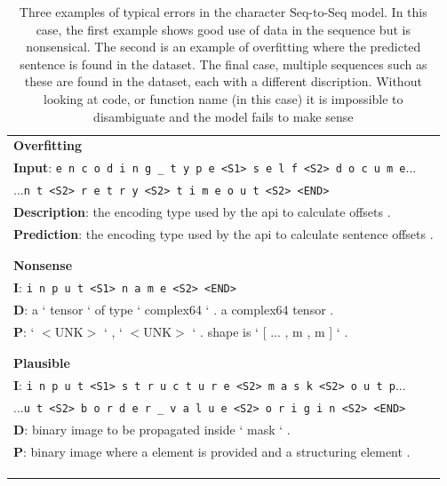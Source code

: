 \begin{table}[ht!]
\begin{center}
\begin{tabular}{ l  }


\textbf{Overfitting}\\

\textbf{Input}: \texttt{e n c o d i n g _ t y p e <S1> s e l f <S2> d o c u m e}...\\
...\texttt{n t <S2> r e t r y <S2> t i m e o u t <S2> <END>}\\
\textbf{Description}: the encoding type used by the api to calculate offsets .\\
\textbf{Prediction}: the encoding type used by the api to calculate sentence offsets . \\
\\\hline\\

\textbf{Nonsense}\\

\textbf{I}: \texttt{i n p u t <S1> n a m e <S2> <END>}\\
\textbf{D}: a ` tensor ` of type ` complex64 ` . a complex64 tensor .\\
\textbf{P}: ` $<$UNK$>$ ` , ` $<$UNK$>$ ` . shape is ` [ ... , m , m ] ` . \\
\\\hline\\

\textbf{Plausible}\\

\textbf{I}: \texttt{i n p u t <S1> s t r u c t u r e <S2> m a s k <S2> o u t p}...\\
...\texttt{u t <S2> b o r d e r _ v a l u e <S2> o r i g i n <S2> <END>}\\
\textbf{D}: binary image to be propagated inside ` mask ` .\\
\textbf{P}: binary image where a element is provided and a structuring element .\\
\\\hline\\

\\

\end{tabular}
\caption{Three examples of typical errors in the character Seq-to-Seq model.  In this case, the first example shows good use of data in the sequence but is nonsensical. The second is an example of overfitting where the predicted sentence is found in the dataset. The final case, multiple sequences such as these are found in the dataset, each with a different discription. Without looking at code, or function name (in this case) it is impossible to disambiguate and the model fails to make sense }
\label{table:typicalvarotherargs}
\end{center}
\end{table}

